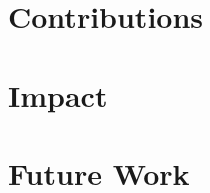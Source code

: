 \section{Contributions}\label{ch:conclusion:contributions}

\section{Impact}\label{ch:conclusion:impact}

\section{Future Work}\label{ch:conclusion:future}
